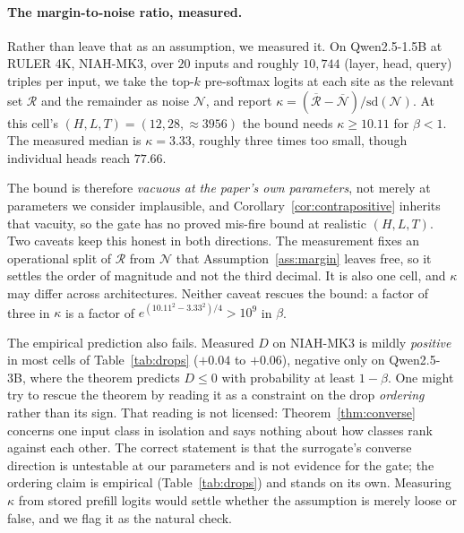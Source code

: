 \paragraph{The margin-to-noise ratio, measured.} Rather than leave that as an
assumption, we measured it. On Qwen2.5-1.5B at RULER 4K, NIAH-MK3, over $20$
inputs and roughly $10{,}744$ (layer, head, query) triples per input, we take
the top-$k$ pre-softmax logits at each site as the relevant set $\mathcal{R}$
and the remainder as noise $\mathcal{N}$, and report
$\kappa = (\overline{\mathcal{R}} - \overline{\mathcal{N}})
/ \mathrm{sd}(\mathcal{N})$. At this cell's $(H, L, T) = (12, 28, {\approx}3956)$
the bound needs $\kappa \ge 10.11$ for $\beta < 1$. The measured median is
$\kappa = 3.33$, roughly three times too small, though individual heads reach
$77.66$.

The bound is therefore \emph{vacuous at the paper's own parameters}, not merely
at parameters we consider implausible, and
Corollary~\ref{cor:contrapositive} inherits that vacuity, so the gate has no
proved mis-fire bound at realistic $(H, L, T)$. Two caveats keep this honest in
both directions. The measurement fixes an operational split of $\mathcal{R}$
from $\mathcal{N}$ that Assumption~\ref{ass:margin} leaves free, so it settles
the order of magnitude and not the third decimal. It is also one cell, and
$\kappa$ may differ across architectures. Neither caveat rescues the bound: a
factor of three in $\kappa$ is a factor of $e^{(10.11^2 - 3.33^2)/4} > 10^{9}$
in $\beta$.

The empirical prediction also fails. Measured $D$ on NIAH-MK3 is mildly
\emph{positive} in most cells of Table~\ref{tab:drops} ($+0.04$ to $+0.06$),
negative only on Qwen2.5-3B, where the theorem predicts $D \le 0$ with
probability at least $1 - \beta$. One might try to rescue the theorem by
reading it as a constraint on the drop \emph{ordering} rather than its sign.
That reading is not licensed: Theorem~\ref{thm:converse} concerns one input
class in isolation and says nothing about how classes rank against each other.
The correct statement is that the surrogate's converse direction is untestable at our parameters and
is not evidence for the gate; the ordering claim is empirical
(Table~\ref{tab:drops}) and stands on its own. Measuring $\kappa$ from stored
prefill logits would settle whether the assumption is merely loose or false,
and we flag it as the natural check.


